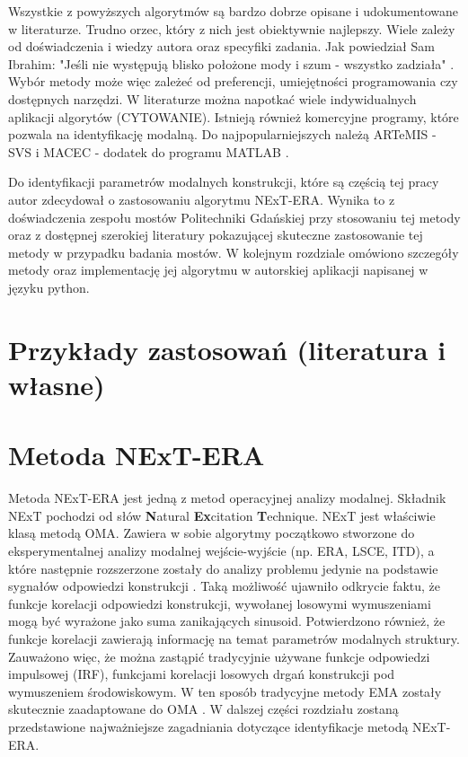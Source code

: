 Wszystkie z powyższych algorytmów są bardzo dobrze opisane i udokumentowane w literaturze. Trudno orzec, który z nich jest obiektywnie najlepszy. Wiele zależy od doświadczenia i wiedzy autora oraz specyfiki zadania. Jak powiedział Sam Ibrahim: "Jeśli nie występują blisko położone mody i szum - wszystko zadziała" . Wybór metody może więc zależeć od preferencji, umiejętności programowania czy dostępnych narzędzi. W literaturze można napotkać wiele indywidualnych aplikacji algorytów (CYTOWANIE). Istnieją również komercyjne programy, które pozwala na identyfikację modalną. Do najpopularniejszych należą ARTeMIS - SVS \parencite{Extractor1999} i MACEC - dodatek do programu MATLAB \parencite{Reynders2014}.

Do identyfikacji parametrów modalnych konstrukcji, które są częścią tej pracy autor zdecydował o zastosowaniu algorytmu NExT-ERA. Wynika to z doświadczenia zespołu mostów Politechniki Gdańskiej przy stosowaniu tej metody oraz z dostępnej szerokiej literatury pokazującej skuteczne zastosowanie tej metody w przypadku badania mostów. W kolejnym rozdziale omówiono szczegóły metody oraz implementację jej algorytmu w autorskiej aplikacji napisanej w języku python.

\section{Przykłady zastosowań (literatura i własne)}


\section{Metoda NExT-ERA}
Metoda NExT-ERA jest jedną z metod operacyjnej analizy modalnej. Składnik NExT pochodzi od słów \textbf{N}atural \textbf{Ex}citation \textbf{T}echnique. NExT jest właściwie klasą metodą OMA. Zawiera w sobie algorytmy początkowo stworzone do eksperymentalnej analizy modalnej wejście-wyjście  (np. ERA, LSCE, ITD), a które następnie rozszerzone zostały do analizy problemu jedynie na podstawie sygnałów odpowiedzi konstrukcji . Taką możliwość ujawniło odkrycie faktu, że funkcje korelacji odpowiedzi konstrukcji, wywołanej losowymi wymuszeniami mogą być wyrażone jako suma zanikających sinusoid. Potwierdzono również, że funkcje korelacji zawierają informację na temat parametrów modalnych struktury. Zauważono więc, że można zastąpić tradycyjnie używane funkcje odpowiedzi impulsowej (IRF), funkcjami korelacji losowych drgań konstrukcji pod wymuszeniem środowiskowym. W ten sposób tradycyjne metody EMA zostały skutecznie zaadaptowane do OMA \parencite{Rainieri2014}. W dalszej części rozdziału zostaną przedstawione najważniejsze zagadniania dotyczące identyfikacje metodą NExT-ERA. 


